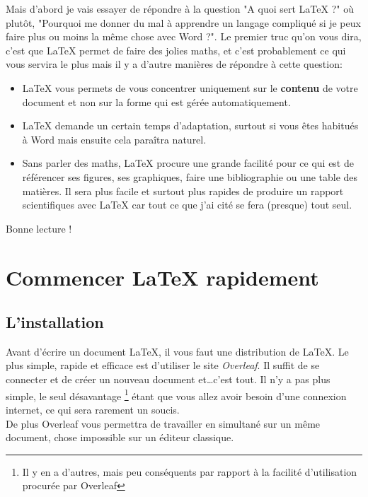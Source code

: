 \documentclass[11pt]{article}				%
\begin{document}
Mais d'abord je vais essayer de répondre à la question "A quoi sert {\LaTeX} ?" où plutôt, "Pourquoi me donner du mal à apprendre un langage compliqué si je peux faire plus ou moins la même chose avec Word ?". Le premier truc qu'on vous dira, c'est que LaTeX permet de faire des jolies maths, et c'est probablement ce qui vous servira le plus mais il y a d'autre manières de répondre à cette question:
\begin{itemize}
	\item LaTeX vous permets de vous concentrer uniquement sur le \textbf{contenu} de votre document et non sur la forme qui est gérée automatiquement.
	\item LaTeX demande un certain temps d'adaptation, surtout si vous êtes habitués à Word mais ensuite cela paraîtra naturel.
	\item Sans parler des maths, LaTeX procure une grande facilité pour ce qui est de référencer ses figures, ses graphiques, faire une bibliographie ou une table des matières. Il sera plus facile et surtout plus rapides de produire un rapport scientifiques avec LaTeX car tout ce que j'ai cité se fera (presque) tout seul.
\end{itemize}  

Bonne lecture !
    
\clearpage

\tableofcontents



\newpage


\section{Commencer {\LaTeX} rapidement}

\subsection{L'installation}

Avant d'écrire un document LaTeX, il vous faut une distribution de LaTeX. Le plus simple, rapide et efficace est d'utiliser le site \textit{Overleaf}. Il suffit de se connecter et de créer un nouveau document et\dots c'est tout. Il n'y a pas plus simple, le seul désavantage \footnote{Il y en a d'autres, mais peu conséquents par rapport à la facilité d'utilisation procurée par Overleaf} étant que vous allez avoir besoin d'une connexion internet, ce qui sera rarement un soucis.\\


De plus Overleaf vous permettra de travailler en simultané sur un même document, chose impossible sur un éditeur classique.
\end{document}

